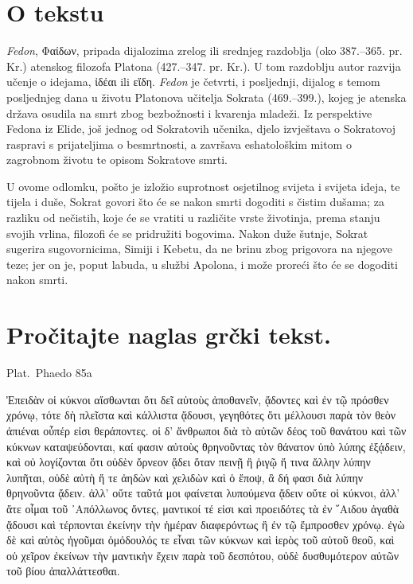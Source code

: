 


\section*{O tekstu}

\textit{Fedon}, Φαίδων, pripada dijalozima zrelog ili srednjeg razdoblja (oko 387.–365. pr. Kr.) atenskog filozofa Platona (427.–347. pr. Kr.). U tom razdoblju autor razvija učenje o idejama, ἰδέαι ili εἴδη. \textit{Fedon} je četvrti, i posljednji, dijalog s temom posljednjeg dana u životu Platonova učitelja Sokrata (469.–399.), kojeg je atenska država osudila na smrt zbog bezbožnosti i kvarenja mladeži. Iz perspektive Fedona iz Elide, još jednog od Sokratovih učenika, djelo izvještava o Sokratovoj raspravi s prijateljima o besmrtnosti, a završava eshatološkim mitom o zagrobnom životu te opisom Sokratove smrti. 

U ovome odlomku, pošto je izložio suprotnost osjetilnog svijeta i svijeta ideja, te tijela i duše, Sokrat govori što će se nakon smrti dogoditi s čistim dušama; za razliku od nečistih, koje će se vratiti u različite vrste životinja, prema stanju svojih vrlina, filozofi će se pridružiti bogovima. Nakon duže šutnje, Sokrat sugerira sugovornicima, Simiji i Kebetu, da ne brinu zbog prigovora na njegove teze; jer on je, poput labuda, u službi Apolona, i može proreći što će se dogoditi nakon smrti.

\newpage

\section*{Pročitajte naglas grčki tekst.}

Plat.\ Phaedo 85a

\medskip

{\large
\begin{greek}
\noindent Ἐπειδὰν οἱ κύκνοι αἴσθωνται ὅτι δεῖ αὐτοὺς ἀποθανεῖν, ᾄδοντες καὶ ἐν τῷ πρόσθεν χρόνῳ, τότε δὴ πλεῖστα καὶ κάλλιστα ᾄδουσι, γεγηθότες ὅτι μέλλουσι παρὰ τὸν θεὸν ἀπιέναι οὗπέρ εἰσι θεράποντες. οἱ δ' ἄνθρωποι διὰ τὸ αὑτῶν δέος τοῦ θανάτου καὶ τῶν κύκνων καταψεύδονται, καί φασιν αὐτοὺς θρηνοῦντας τὸν θάνατον ὑπὸ λύπης ἐξᾴδειν, καὶ οὐ λογίζονται ὅτι οὐδὲν ὄρνεον ᾄδει ὅταν πεινῇ ἢ ῥιγῷ ἤ τινα ἄλλην λύπην λυπῆται, οὐδὲ αὐτὴ ἥ τε ἀηδὼν καὶ χελιδὼν καὶ ὁ ἔποψ, ἃ δή φασι διὰ λύπην θρηνοῦντα ᾄδειν. ἀλλ' οὔτε ταῦτά μοι φαίνεται λυπούμενα ᾄδειν οὔτε οἱ κύκνοι, ἀλλ' ἅτε οἶμαι τοῦ ᾿Απόλλωνος ὄντες, μαντικοί τέ εἰσι καὶ προειδότες τὰ ἐν ῞Αιδου ἀγαθὰ ᾄδουσι καὶ τέρπονται ἐκείνην τὴν ἡμέραν διαφερόντως ἢ ἐν τῷ ἔμπροσθεν χρόνῳ. ἐγὼ δὲ καὶ αὐτὸς ἡγοῦμαι ὁμόδουλός τε εἶναι τῶν κύκνων καὶ ἱερὸς τοῦ αὐτοῦ θεοῦ, καὶ οὐ χεῖρον ἐκείνων τὴν μαντικὴν ἔχειν παρὰ τοῦ δεσπότου,  οὐδὲ δυσθυμότερον αὐτῶν τοῦ βίου ἀπαλλάττεσθαι.

\end{greek}

}

